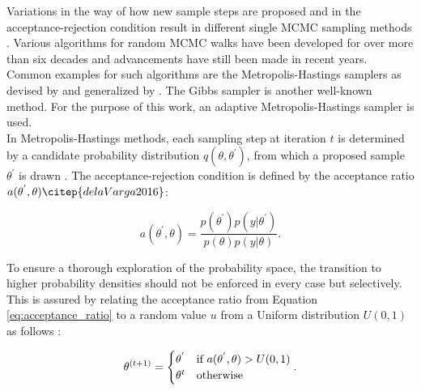         Variations in the way of how new  sample steps are proposed and in the acceptance-rejection condition result in different single MCMC sampling methods \citep{schaaf2017, delaVarga2016}. Various algorithms for random MCMC walks have been developed for over more than six decades and advancements have still been made in recent years. Common examples for such algorithms are the Metropolis-Hastings samplers as devised by \citet{metropolis1953equation} and generalized by \citet{hastings1970}. The Gibbs sampler \citep{geman1984stochastic} is another well-known method. 
        For the purpose of this work, an adaptive Metropolis-Hastings sampler is used.\\
        In Metropolis-Hastings methods, each sampling step at iteration $t$ is determined by a candidate probability distribution $q(\theta,\theta^{'})$, from which a proposed sample $\theta^{'}$ is drawn \citep{delaVarga2016}. The acceptance-rejection condition is defined by the acceptance ratio $a(\theta^{'},\theta) \citep{delaVarga2016}$:
        
        \begin{equation}\label{eq:acceptance_ratio}
        a(\theta^{'},\theta)=\frac{p(\theta^{'})p(y|\theta^{'})}{p(\theta)p(y|\theta)}.
        \end{equation}
        
        To ensure a thorough exploration of the probability space, the transition to higher probability densities should not be enforced in every case but selectively. This is assured by relating the acceptance ratio from Equation \ref{eq:acceptance_ratio} to a random value $u$ from a Uniform distribution $U(0,1)$ as follows \citep{delaVarga2016}:
        
        \begin{equation}\label{eq:transition_selectivity}
        \theta^{(t+1)}=\begin{cases}
        \theta^{'} & $if $ a(\theta^{'},\theta)>U(0,1)\\
        \theta^{t} & $otherwise$\\
        \end{cases}.
        \end{equation}
        
